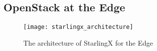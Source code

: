 \subsection{OpenStack at the Edge}

\begin{figure}
    \centering
    \texttt{[image: starlingx\_architecture]}
    \label{fig:figure13}
    \caption{The architecture of StarlingX for the Edge}
\end{figure}

